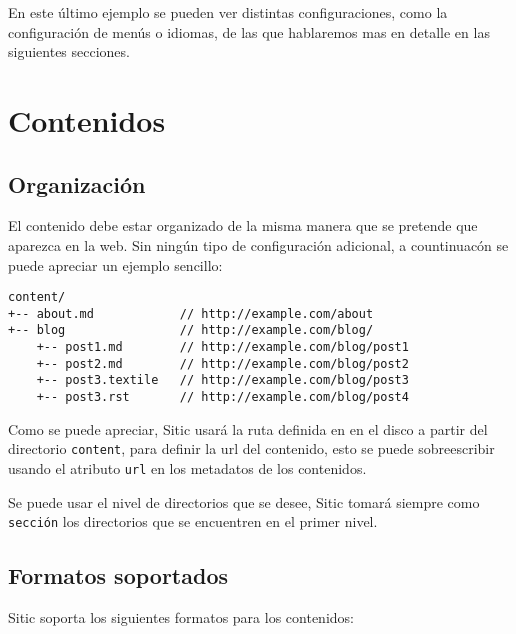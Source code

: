 En este último ejemplo se pueden ver distintas configuraciones, como la configuración de menús o
idiomas, de las que hablaremos mas en detalle en las siguientes secciones.



\section{Contenidos}

\subsection{Organización}

El contenido debe estar organizado de la misma manera que se pretende que aparezca en la web.
Sin ningún tipo de configuración adicional, a countinuacón se puede apreciar un ejemplo sencillo:

\begin{verbatim}
content/
+-- about.md            // http://example.com/about
+-- blog                // http://example.com/blog/
    +-- post1.md        // http://example.com/blog/post1
    +-- post2.md        // http://example.com/blog/post2
    +-- post3.textile   // http://example.com/blog/post3
    +-- post3.rst       // http://example.com/blog/post4
\end{verbatim}

Como se puede apreciar, Sitic usará la ruta definida en en el disco a partir del directorio \texttt{content},
para definir la url del contenido, esto se puede sobreescribir usando el atributo \texttt{url} en los metadatos
de los contenidos.

Se puede usar el nivel de directorios que se desee, Sitic tomará siempre como \texttt{sección} los
directorios que se encuentren en el primer nivel.

\subsection{Formatos soportados}

Sitic soporta los siguientes formatos para los contenidos:

